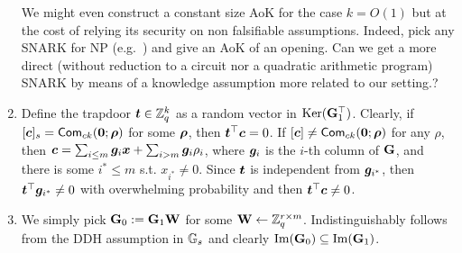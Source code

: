 \begin{enumerate}[label=(\alph*)]
We might even construct a constant size AoK for the case $k=O(1)$ but at the cost of relying its security on non falsifiable assumptions. Indeed, pick any SNARK for NP (e.g.~\cite{EC:Groth16}) and give an AoK of an opening. {\color{red} Can we get a more direct (without reduction to a circuit nor a quadratic arithmetic program) SNARK by means of a knowledge assumption more related to our setting.?}
\item Define the trapdoor ${\boldsymbol{t}}\in\mathbb{Z}_q^k$ as a random vector in $\mathrm{Ker}(\mathbf{{G}}_1^\top)$. 
Clearly, if $[{\boldsymbol{c}}]_s=\mathsf{Com}_{ck}({\boldsymbol{0}};{\boldsymbol{\rho}})$ for some ${\boldsymbol{\rho}}$, then ${\boldsymbol{t}}^\top{\boldsymbol{c}}=0$. If $[{\boldsymbol{c}}]\neq\mathsf{Com}_{ck}({\boldsymbol{0}};{\boldsymbol{\rho}})$ for any $\rho$, then ${\boldsymbol{c}}=\sum_{i\leq m}{\boldsymbol{g}}_i{\boldsymbol{x}}+\sum_{i>m}{\boldsymbol{g}}_i\rho_i$, where ${\boldsymbol{g}}_i$ is the $i$-th column of $\mathbf{{G}}$, and there is some $i^*\leq m$ s.t. $x_{i^*}\neq 0$. Since ${\boldsymbol{t}}$ is independent from ${\boldsymbol{g}}_{i^*}$, then ${\boldsymbol{t}}^\top{\boldsymbol{g}}_{i^*}\neq 0$ with overwhelming probability and then ${\boldsymbol{t}}^\top{\boldsymbol{c}}\neq 0$. 
\item We simply pick $\mathbf{{G}}_0:=\mathbf{{G}}_1\mathbf{{W}}$ for some $\mathbf{{W}}\gets\mathbb{Z}_q^{r\times m}$. Indistinguishably follows from the DDH assumption in $\mathbb{G}_s$ and clearly $\mathrm{Im}(\mathbf{{G}}_0)\subseteq\mathrm{Im}(\mathbf{{G}}_1)$.
\end{enumerate}

